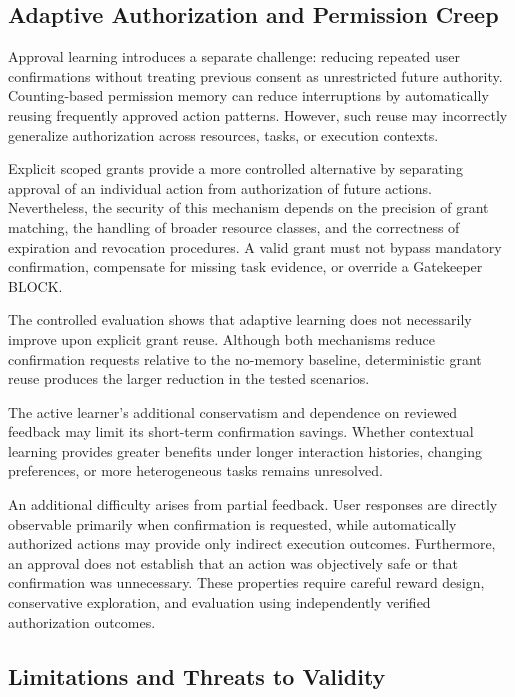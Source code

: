 \documentclass[10pt,conference]{IEEEtran}
\begin{document}
\subsection{Adaptive Authorization and Permission Creep}

Approval learning introduces a separate challenge: reducing repeated user confirmations without treating previous consent as unrestricted future authority. Counting-based permission memory can reduce interruptions by automatically reusing frequently approved action patterns. However, such reuse may incorrectly generalize authorization across resources, tasks, or execution contexts.

Explicit scoped grants provide a more controlled alternative by separating approval of an individual action from authorization of future actions. Nevertheless, the security of this mechanism depends on the precision of grant matching, the handling of broader resource classes, and the correctness of expiration and revocation procedures. A valid grant must not bypass mandatory confirmation, compensate for missing task evidence, or override a Gatekeeper BLOCK.


The controlled evaluation shows that adaptive
learning does not necessarily improve upon
explicit grant reuse. Although both mechanisms
reduce confirmation requests relative to the
no-memory baseline, deterministic grant reuse
produces the larger reduction in the tested
scenarios.

The active learner's additional conservatism
and dependence on reviewed feedback may
limit its short-term confirmation savings.
Whether contextual learning provides greater
benefits under longer interaction histories,
changing preferences, or more heterogeneous
tasks remains unresolved.


An additional difficulty arises from partial feedback. User responses are directly observable primarily when confirmation is requested, while automatically authorized actions may provide only indirect execution outcomes. Furthermore, an approval does not establish that an action was objectively safe or that confirmation was unnecessary. These properties require careful reward design, conservative exploration, and evaluation using independently verified authorization outcomes.

\subsection{Limitations and Threats to Validity}
\end{document}
